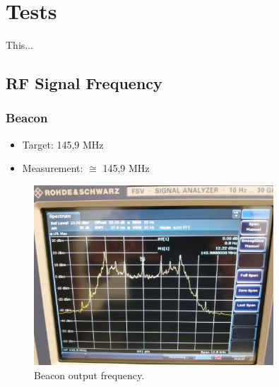 %
%
%
%
%

%
%
%
%
%
%

\chapter{Tests} \label{ch:tests}

This...

\section{RF Signal Frequency}

\subsection{Beacon}

\begin{itemize}
    \item Target: 145,9 MHz
    \item Measurement: $\cong$ 145,9 MHz
\end{itemize}

\begin{figure}[H]
    \begin{center}
        \includegraphics[width=0.8\textwidth]{figures/tests/beacon_frequency.jpg}
        \caption{Beacon output frequency.}
        \label{fig:beacon-frequency}
    \end{center}
\end{figure}

